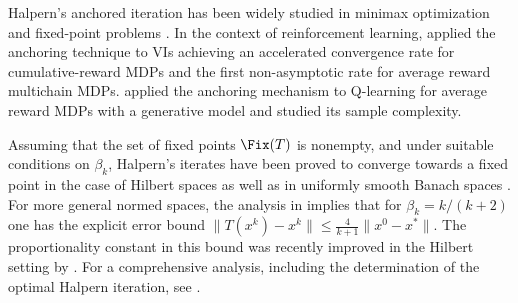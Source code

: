 Halpern's anchored iteration has been widely studied in minimax optimization and fixed-point problems \citep{halpern1967fixed,sabach2017first, Lieder2021halpern, park2022exact, contreras2022optimal, yoon2021accelerated,cai2022stochastic}. In the context of reinforcement learning, \citet{lee2024accelerating, lee2025multi} applied the anchoring technique to VIs achieving an accelerated convergence rate for cumulative-reward MDPs and the first non-asymptotic rate for average reward multichain MDPs. \citet{bravostochastic} applied the anchoring mechanism to Q-learning for average reward MDPs with a generative model and studied its sample complexity. 


Assuming that the set of fixed points $\Fix(T)$ is nonempty, and under suitable conditions on $\beta_k$, Halpern's iterates have been proved to converge towards a fixed point in the case of Hilbert spaces \citep{wittmann1992approximation} as well as in uniformly smooth Banach spaces \citep{reich1980strong, xu2002iterative}. 
For more general normed spaces, the analysis in \citet[Lemma 5]{sabach2017first} implies that for $\beta_k=k/(k+2)$ one has the 
explicit error bound $\|T(x^k)-x^k\|\leq \frac{4}{k+1}\|x^0-x^*\|$.
The proportionality constant in this bound was recently improved in the Hilbert setting by \citet{Lieder2021halpern, kim2021accelerated}. For a comprehensive analysis, including the determination of the optimal Halpern iteration, see \citet{ contreras2022optimal}.